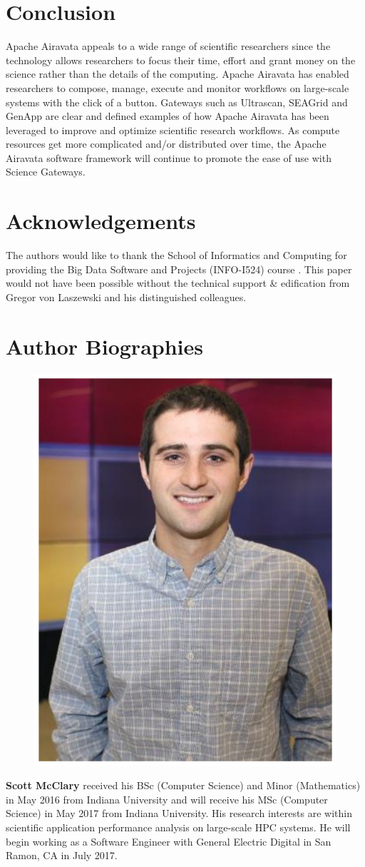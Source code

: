 \documentclass[9pt,twocolumn,twoside]{../../styles/osajnl}
\begin{document}
\section{Conclusion} \label{conclusion}
Apache Airavata appeals to a wide range of scientific researchers
since the technology allows researchers to focus their time, effort
and grant money on the science rather than the details of the
computing. Apache Airavata has enabled researchers to compose, manage,
execute and monitor workflows on large-scale systems with the click of
a button. Gateways such as Ultrascan, SEAGrid and GenApp are clear and
defined examples of how Apache Airavata has been leveraged to improve
and optimize scientific research workflows. As compute resources get
more complicated and/or distributed over time, the Apache Airavata
software framework will continue to promote the ease of use with
Science Gateways.

\section*{Acknowledgements}
The authors would like to thank the School of Informatics and
Computing for providing the Big Data Software and Projects (INFO-I524)
course \cite{www-i524}. This paper would not have been possible
without the technical support \& edification from Gregor von Laszewski
and his distinguished colleagues.

 
\section*{Author Biographies}
\begingroup
\setlength\intextsep{0pt}
\begin{minipage}[t][3.2cm][t]{1.0\columnwidth} 
  \begin{figure}
    \includegraphics[width=0.25\columnwidth]{images/scott_mcclary}
  \end{figure}
  \noindent
  {\bfseries Scott McClary} received his BSc (Computer Science) and
  Minor (Mathematics) in May 2016 from Indiana University and will
  receive his MSc (Computer Science) in May 2017 from Indiana
  University. His research interests are within scientific application
  performance analysis on large-scale HPC systems. He will begin
  working as a Software Engineer with General Electric Digital in San
  Ramon, CA in July 2017.
\end{minipage}
\endgroup
\end{document}
